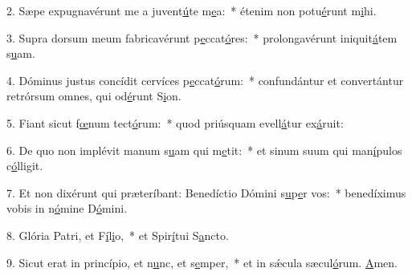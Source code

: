 2. Sæpe expugnavérunt me a juvent\uline{ú}te m\uline{e}a:~* étenim non potu\uline{é}runt m\uline{i}hi.\par 
3. Supra dorsum meum fabricavérunt p\uline{e}ccat\uline{ó}res:~* prolongavérunt iniquit\uline{á}tem s\uline{u}am.\par 
4. Dóminus justus concídit cervíces p\uline{e}ccat\uline{ó}rum:~* confundántur et convertántur retrórsum omnes, qui od\uline{é}runt S\uline{i}on.\par 
5. Fiant sicut f\uline{œ}num tect\uline{ó}rum:~* quod priúsquam evell\uline{á}tur ex\uline{á}ruit:\par 
6. De quo non implévit manum s\uline{u}am qui m\uline{e}tit:~* et sinum suum qui man\uline{í}pulos c\uline{ó}lligit.\par 
7. Et non dixérunt qui præteríbant: Benedíctio Dómini s\uline{u}p\uline{e}r vos:~* benedíximus vobis in n\uline{ó}mine D\uline{ó}mini.\par 
8. Glória Patri, et F\uline{í}l\uline{i}o,~* et Spir\uline{í}tui S\uline{a}ncto.\par 
9. Sicut erat in princípio, et n\uline{u}nc, et s\uline{e}mper,~* et in sǽcula sæcul\uline{ó}rum. \uline{A}men.\par 
